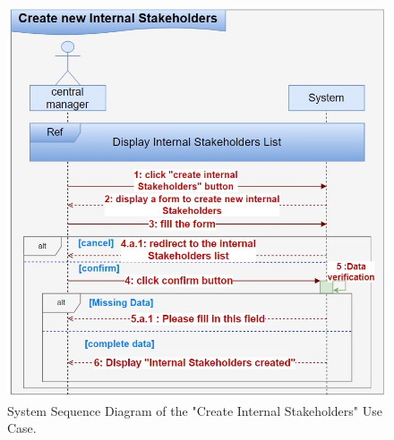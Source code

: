 \begin{figure}[h!]
    \centering
    \includegraphics[width=1\textwidth]{figures/seqcreate internal skateholder.png}
    \caption{System Sequence Diagram of the "Create Internal Stakeholders" Use Case.}
\end{figure}
\clearpage


